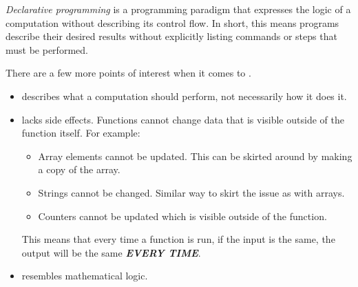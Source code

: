 \begin{definition}\label{def:Declarative_Programming}
  \emph{Declarative programming} is a programming paradigm that expresses the logic of a computation without describing its control flow.
  In short, this means programs describe their desired results without explicitly listing commands or steps that must be performed.

  There are a few more points of interest when it comes to .
  \begin{itemize}[noitemsep]
  \item {} describes what a computation should perform, not necessarily how it does it.
  \item {} lacks side effects. Functions cannot change data that is visible outside of the function itself. For example:
    \begin{itemize}[noitemsep]
    \item Array elements cannot be updated. This can be skirted around by making a copy of the array.
    \item Strings cannot be changed. Similar way to skirt the issue as with arrays.
    \item Counters cannot be updated which is visible outside of the function.
    \end{itemize}
    This means that every time a function is run, if the input is the same, the output will be the same \textbf{\emph{EVERY TIME}}.
  \item {} resembles mathematical logic.
  \end{itemize}
\end{definition}

